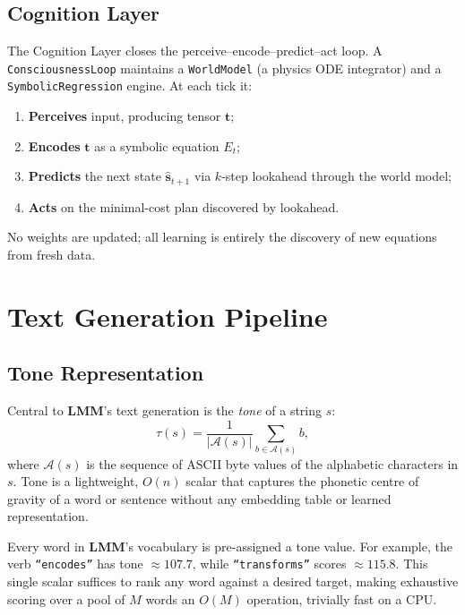 \documentclass[11pt,a4paper]{article}
\newcommand{\lmm}{\texorpdfstring{%
  \textbf{\color{lmmAccent}LMM}}{LMM}}
\begin{document}
\subsection{Cognition Layer}

The Cognition Layer closes the perceive--encode--predict--act loop. A \texttt{ConsciousnessLoop} maintains a \texttt{WorldModel} (a physics ODE integrator) and a \texttt{SymbolicRegression} engine. At each tick it:
\begin{enumerate}[noitemsep,topsep=4pt]
  \item \textbf{Perceives} input, producing tensor $\mathbf{t}$;
  \item \textbf{Encodes} $\mathbf{t}$ as a symbolic equation $E_t$;
  \item \textbf{Predicts} the next state $\hat{\mathbf{s}}_{t+1}$ via $k$-step lookahead through the world model;
  \item \textbf{Acts} on the minimal-cost plan discovered by lookahead.
\end{enumerate}
No weights are updated; all learning is entirely the discovery of new equations from fresh data.

\section{Text Generation Pipeline}
\label{sec:textgen}

\subsection{Tone Representation}
\label{sec:tone}

Central to \lmm{}'s text generation is the \emph{tone} of a string $s$:
\begin{equation}
  \tau(s) = \frac{1}{|\mathcal{A}(s)|}\sum_{b \in \mathcal{A}(s)} b,
  \label{eq:tone}
\end{equation}
where $\mathcal{A}(s)$ is the sequence of ASCII byte values of the alphabetic characters in $s$. Tone is a lightweight, $O(n)$ scalar that captures the phonetic centre of gravity of a word or sentence without any embedding table or learned representation.

Every word in \lmm{}'s vocabulary is pre-assigned a tone value. For example, the verb \texttt{``encodes''} has tone $\approx 107.7$, while \texttt{``transforms''} scores $\approx 115.8$. This single scalar suffices to rank any word against a desired target, making exhaustive scoring over a pool of $M$ words an $O(M)$ operation, trivially fast on a CPU.
\end{document}
